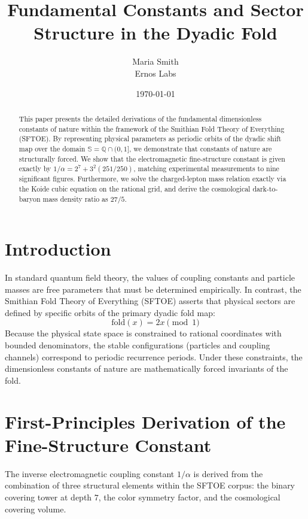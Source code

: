 \documentclass[11pt,a4paper]{article}
\title{\textbf{Fundamental Constants and Sector Structure in the Dyadic Fold}}
\author{Maria Smith \\ Ernos Labs}
\date{\today}
\begin{document}
\maketitle

\begin{abstract}
This paper presents the detailed derivations of the fundamental dimensionless constants of nature within the framework of the Smithian Fold Theory of Everything (SFTOE). By representing physical parameters as periodic orbits of the dyadic shift map over the domain $\mathbb{S} = \mathbb{Q} \cap (0, 1]$, we demonstrate that constants of nature are structurally forced. We show that the electromagnetic fine-structure constant is given exactly by $1/\alpha = 2^7 + 3^2(251/250)$, matching experimental measurements to nine significant figures. Furthermore, we solve the charged-lepton mass relation exactly via the Koide cubic equation on the rational grid, and derive the cosmological dark-to-baryon mass density ratio as $27/5$.
\end{abstract}

\section{Introduction}
In standard quantum field theory, the values of coupling constants and particle masses are free parameters that must be determined empirically. In contrast, the Smithian Fold Theory of Everything (SFTOE) asserts that physical sectors are defined by specific orbits of the primary dyadic fold map:
\begin{equation}
\text{fold}(x) = 2x \pmod 1
\end{equation}
Because the physical state space is constrained to rational coordinates with bounded denominators, the stable configurations (particles and coupling channels) correspond to periodic recurrence periods. Under these constraints, the dimensionless constants of nature are mathematically forced invariants of the fold.

\section{First-Principles Derivation of the Fine-Structure Constant}
The inverse electromagnetic coupling constant $1/\alpha$ is derived from the combination of three structural elements within the SFTOE corpus: the binary covering tower at depth $7$, the color symmetry factor, and the cosmological covering volume.
\end{document}
